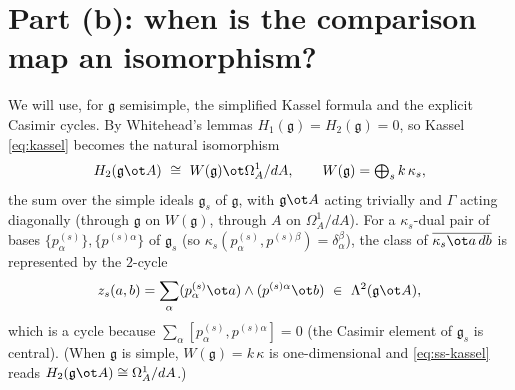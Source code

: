 \documentclass{amsart}
\theoremstyle{definition}
\newcommand{\g}{\mathfrak{g}}
\newcommand{\Om}{\Omega}
\newcommand{\Gm}{\Gamma}
\begin{document}
\section{Part (b): when is the comparison map an isomorphism?}

We will use, for $\g$ semisimple, the simplified Kassel formula and the explicit
Casimir cycles.  By Whitehead's lemmas $H_1(\g)=H_2(\g)=0$, so Kassel
\eqref{eq:kassel} becomes the natural isomorphism
\begin{equation}\label{eq:ss-kassel}
   H_2(\g\ot A)\ \cong\ W(\g)\ot\Om^1_A/dA ,\qquad
   W(\g)=\textstyle\bigoplus_{s}k\,\kappa_s ,
\end{equation}
the sum over the simple ideals $\g_s$ of $\g$, with $\g\ot A$ acting trivially and
$\Gm$ acting diagonally (through $\g$ on $W(\g)$, through $A$ on $\Om^1_A/dA$).  For
a $\kappa_s$-dual pair of bases $\{p^{(s)}_\alpha\},\{p^{(s)\alpha}\}$ of $\g_s$
(so $\kappa_s(p^{(s)}_\alpha,p^{(s)\beta})=\delta_\alpha^\beta$), the class of
$\overline{\kappa_s\ot a\,db}$ is represented by the $2$-cycle
\begin{equation}\label{eq:cas-cycle}
   z_s(a,b)=\sum_\alpha (p^{(s)}_\alpha\ot a)\wedge(p^{(s)\alpha}\ot b)
   \ \in\ \Lambda^2(\g\ot A),
\end{equation}
which is a cycle because $\sum_\alpha[p^{(s)}_\alpha,p^{(s)\alpha}]=0$ (the
Casimir element of $\g_s$ is central).  (When $\g$ is simple, $W(\g)=k\,\kappa$ is
one-dimensional and \eqref{eq:ss-kassel} reads $H_2(\g\ot A)\cong\Om^1_A/dA$.)
\end{document}
